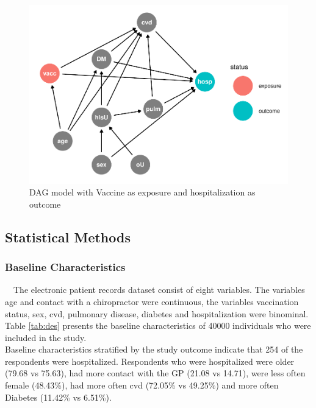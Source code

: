 \documentclass[
]{article}
\begin{document}
\begin{figure}
\includegraphics[width=0.5\linewidth]{Assignment_files/figure-latex/dag-1} \caption{DAG model with Vaccine as exposure and hospitalization as outcome}\label{fig:dag}
\end{figure}

\hypertarget{statistical-methods}{%
\subsection{Statistical Methods}\label{statistical-methods}}

\hypertarget{baseline-characteristics}{%
\subsubsection{Baseline Characteristics}\label{baseline-characteristics}}

~~The electronic patient records dataset consist of eight variables. The variables age and contact with a chiropractor were continuous, the variables vaccination status, sex, cvd, pulmonary disease, diabetes and hospitalization were binominal. Table \ref{tab:des} presents the baseline characteristics of 40000 individuals who were included in the study.\\
\hspace*{0.333em}\hspace*{0.333em}Baseline characteristics stratified by the study outcome indicate that 254 of the respondents were hospitalized. Respondents who were hospitalized were older (79.68 vs 75.63), had more contact with the GP (21.08 vs 14.71), were less often female (48.43\%), had more often cvd (72.05\% vs 49.25\%) and more often Diabetes (11.42\% vs 6.51\%).
\end{document}
